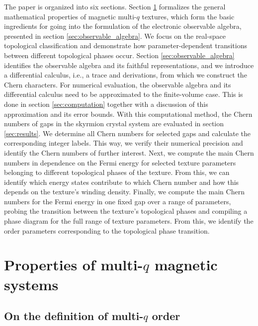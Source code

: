\documentclass[submission, Phys]{SciPost}
\begin{document}
The paper is organized into six sections. 
Section \ref{sec:multi_q_magnets} formalizes the general mathematical properties of magnetic multi-$q$ textures, which form the basic ingredients for going into the formulation of the electronic observable algebra, presented in section \ref{sec:observable_algebra}. We focus on the real-space topological classification and demonstrate how parameter-dependent transitions between different topological phases occur.
Section \ref{sec:observable_algebra} identifies the observable algebra and its faithful representations, and we introduce a differential calculus, i.e., a trace and derivations, from which we construct the Chern characters.
For numerical evaluation, the observable algebra and its differential calculus need to be approximated to the finite-volume case. This is done in section \ref{sec:computation} together with a discussion of this approximation and its error bounds.
With this computational method, the Chern numbers of gaps in the skyrmion crystal system are evaluated in section \ref{sec:results}.
We determine all Chern numbers for selected gaps and calculate the corresponding integer labels. This way, we verify their numerical precision and identify the Chern numbers of further interest.
Next, we compute the main Chern numbers in dependence on the Fermi energy for selected texture parameters belonging to different topological phases of the texture. From this, we can identify which energy states contribute to which Chern number and how this depends on the texture's winding density.
Finally, we compute the main Chern numbers for the Fermi energy in one fixed gap over a range of parameters, probing the transition between the texture's topological phases and compiling a phase diagram for the full range of texture parameters. From this, we identify the order parameters corresponding to the topological phase transition. %

\section{Properties of multi-\texorpdfstring{$q$}{q} magnetic systems}
\label{sec:multi_q_magnets}

\subsection{On the definition of multi-\texorpdfstring{$q$}{q} order}
\label{subsec:definition}
\end{document}
